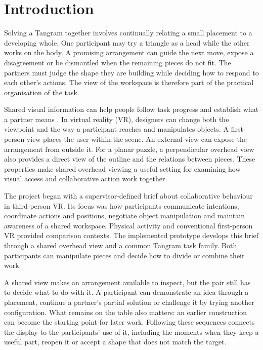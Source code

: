 \chapter{Introduction}\label{chap:1}

Solving a Tangram together involves continually relating a small placement to a developing whole. One participant may try a triangle as a head while the other works on the body. A promising arrangement can guide the next move, expose a disagreement or be dismantled when the remaining pieces do not fit. The partners must judge the shape they are building while deciding how to respond to each other's actions. The view of the workspace is therefore part of the practical organisation of the task.

Shared visual information can help people follow task progress and establish what a partner means \cite{gutwin2002,gergle2013}. In virtual reality (VR), designers can change both the viewpoint and the way a participant reaches and manipulates objects. A first-person view places the user within the scene. An external view can expose the arrangement from outside it. For a planar puzzle, a perpendicular overhead view also provides a direct view of the outline and the relations between pieces. These properties make shared overhead viewing a useful setting for examining how visual access and collaborative action work together.

The project began with a supervisor-defined brief about collaborative behaviour in third-person VR. Its focus was how participants communicate intentions, coordinate actions and positions, negotiate object manipulation and maintain awareness of a shared workspace. Physical activity and conventional first-person VR provided comparison contexts. The implemented prototype develops this brief through a shared overhead view and a common Tangram task family. Both participants can manipulate pieces and decide how to divide or combine their work.

A shared view makes an arrangement available to inspect, but the pair still has to decide what to do with it. A participant can demonstrate an idea through a placement, continue a partner's partial solution or challenge it by trying another configuration. What remains on the table also matters: an earlier construction can become the starting point for later work. Following these sequences connects the display to the participants' use of it, including the moments when they keep a useful part, reopen it or accept a shape that does not match the target.

